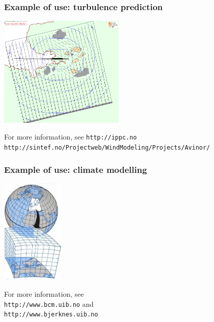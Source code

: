 \documentclass{beamer}
\begin{document}
\begin{frame}\frametitle{Example of use: turbulence prediction}
\begin{center}
\includegraphics[width=6cm]{simra}
\end{center}
For more information, see \texttt{http://ippc.no} \\
\texttt{http://sintef.no/Projectweb/WindModeling/Projects/Avinor/}
\end{frame}

\begin{frame}\frametitle{Example of use: climate modelling}
\begin{center}
\includegraphics[width=3cm]{climate_model}
\end{center}
For more information, see \\
\texttt{http://www.bcm.uib.no} and \\
\texttt{http://www.bjerknes.uib.no}
\end{frame}
\end{document}
